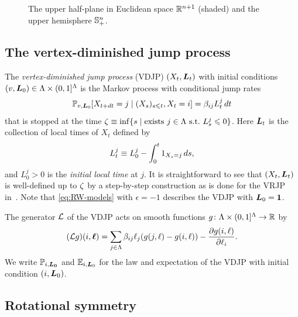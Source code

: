 \documentclass[11pt,a4paper]{article}
\begin{document}
\begin{figure}
\begin{center}
  
\end{center}
\caption{The upper half-plane in Euclidean space
  $\mathbb{R}^{n+1}$ (shaded) and the upper hemisphere ${\mathbb S}^{n}_{+}$.}
\label{fig:spherical}
\end{figure}

\subsection{The vertex-diminished jump process}
\label{sec:vert-dimin-jump}

The \emph{vertex-diminished jump process} (VDJP)
$(X_{t},\boldsymbol{L}_{t})$ with initial conditions
$(v,\boldsymbol{L}_{0})\in\Lambda\times (0,1]^{\Lambda}$
is the Markov process with conditional jump rates
\begin{equation}
  \label{eq:VDJP}
  \P_{v,\V{L}_{0}}\cb{X_{t+dt}=j \mid (X_{s})_{s\leq t}, X_{t}=i} = \beta_{ij}L^{j}_{t}\,dt
\end{equation}
that is stopped at the time
$\zeta \equiv \inf \{s \mid \text{exists $j\in\Lambda$ s.t.\
  $L^{j}_{s}\leqslant 0$}\}$.  Here $\boldsymbol{L}_{t}$ is the collection of local
times of $X_{t}$ defined by
\begin{equation}
  \label{eq:local-VDJP}
  L^{j}_{t} \equiv L^{j}_{0} - \int_{0}^{t}1_{X_{s}=j}\,ds,
\end{equation}
and $L^{j}_{0}>0$ is the \emph{initial local time} at $j$. It is
straightforward to see that $(X_{t},\boldsymbol{L}_{t})$ is well-defined up to
$\zeta$ by a step-by-step construction as is done for the VRJP
in~\cite{MR2027294}.
Note that \eqref{eq:RW-models} with $\epsilon=-1$ describes the VDJP with
$\boldsymbol{L}_{0}=\boldsymbol{1}$.

The generator $\mathcal L$ of the VDJP acts on smooth functions
$g\colon\Lambda\times (0,1]^{\Lambda}\to \mathbb{R}$ by
\begin{equation}
  \label{eq:VDJP-gen}
  (\mathcal L g)(i,\boldsymbol{\ell}) =
  \sum_{j\in\Lambda}\beta_{ij}\ell_{j}(g(j,\ell)-g(i,\ell))
  - \frac{\partial g(i,\ell)}{\partial \ell_{i}}.
\end{equation}
We write $\mathbb{P}_{i,\boldsymbol{L_{0}}}$ and $\mathbb{E}_{i,\boldsymbol{L}_{0}}$ for the law
and expectation of the VDJP with initial condition $(i,\boldsymbol{L}_{0})$.


\subsection{Rotational symmetry}
\end{document}
